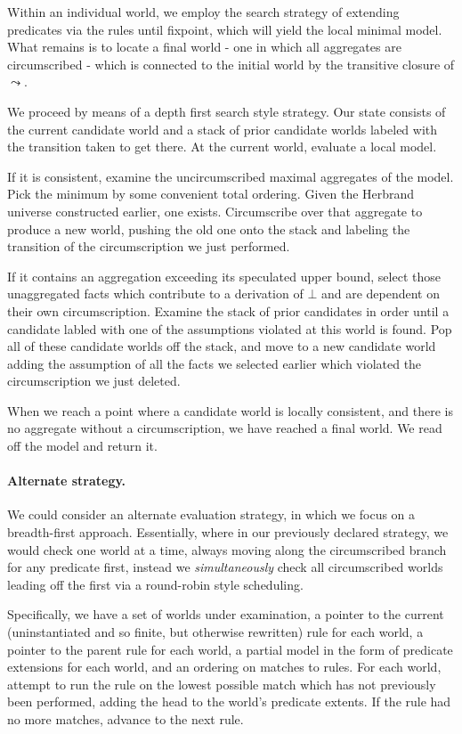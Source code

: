 Within an individual world, we employ the search strategy of extending predicates via the rules until fixpoint, which will yield the local minimal model.
What remains is to locate a final world - one in which all aggregates are circumscribed - which is connected to the initial world by the transitive closure of $\leadsto$.

We proceed by means of a depth first search style strategy.
Our state consists of the current candidate world and a stack of prior candidate worlds labeled with the transition taken to get there.
At the current world, evaluate a local model.

If it is consistent, examine the uncircumscribed maximal aggregates of the model.
Pick the minimum by some convenient total ordering.
Given the Herbrand universe constructed earlier, one exists.
Circumscribe over that aggregate to produce a new world, pushing the old one onto the stack and labeling the transition of the circumscription we just performed. 

If it contains an aggregation exceeding its speculated upper bound, select those unaggregated facts which contribute to a derivation of $\bot$ and are dependent on their own circumscription.
Examine the stack of prior candidates in order until a candidate labled with one of the assumptions violated at this world is found.
Pop all of these candidate worlds off the stack, and move to a new candidate world adding the assumption of all the facts we selected earlier which violated the circumscription we just deleted.

When we reach a point where a candidate world is locally consistent, and there is no aggregate without a circumscription, we have reached a final world.
We read off the model and return it.

\paragraph{Alternate strategy.}
We could consider an alternate evaluation strategy, in which we focus on a breadth-first approach.
Essentially, where in our previously declared strategy, we would check one world at a time, always moving along the circumscribed branch for any predicate first, instead we \emph{simultaneously} check all circumscribed worlds leading off the first via a round-robin style scheduling.

Specifically, we have a set of worlds under examination, a pointer to the current (uninstantiated and so finite, but otherwise rewritten) rule for each world, a pointer to the parent rule for each world, a partial model in the form of predicate extensions for each world, and an ordering on matches to rules.
For each world, attempt to run the rule on the lowest possible match which has not previously been performed, adding the head to the world's predicate extents.
If the rule had no more matches, advance to the next rule.

